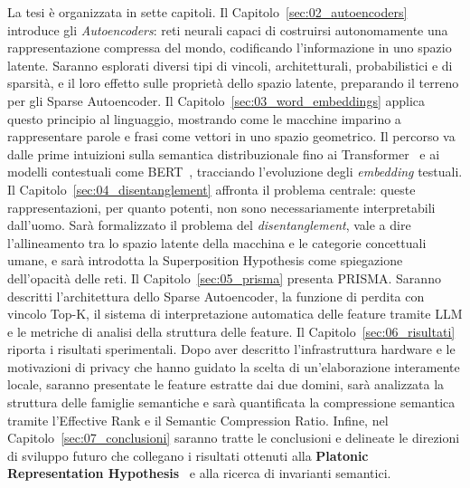 La tesi è organizzata in sette capitoli.
Il Capitolo~\ref{sec:02_autoencoders} introduce gli \textit{Autoencoders}: reti neurali capaci di costruirsi autonomamente una rappresentazione compressa del mondo, codificando l'informazione in uno spazio latente. Saranno esplorati diversi tipi di vincoli, architetturali, probabilistici e di sparsità, e il loro effetto sulle proprietà dello spazio latente, preparando il terreno per gli Sparse Autoencoder.
Il Capitolo~\ref{sec:03_word_embeddings} applica questo principio al linguaggio, mostrando come le macchine imparino a rappresentare parole e frasi come vettori in uno spazio geometrico. Il percorso va dalle prime intuizioni sulla semantica distribuzionale fino ai Transformer~\parencite{vaswani2017attention} e ai modelli contestuali come BERT~\parencite{devlin2018bert}, tracciando l'evoluzione degli \textit{embedding} testuali.
Il Capitolo~\ref{sec:04_disentanglement} affronta il problema centrale: queste rappresentazioni, per quanto potenti, non sono necessariamente interpretabili dall'uomo. Sarà formalizzato il problema del \textit{disentanglement}, vale a dire l'allineamento tra lo spazio latente della macchina e le categorie concettuali umane, e sarà introdotta la Superposition Hypothesis come spiegazione dell'opacità delle reti.
Il Capitolo~\ref{sec:05_prisma} presenta PRISMA. Saranno descritti l'architettura dello Sparse Autoencoder, la funzione di perdita con vincolo Top-K, il sistema di interpretazione automatica delle feature tramite LLM e le metriche di analisi della struttura delle feature.
Il Capitolo~\ref{sec:06_risultati} riporta i risultati sperimentali. Dopo aver descritto l'infrastruttura hardware e le motivazioni di privacy che hanno guidato la scelta di un'elaborazione interamente locale, saranno presentate le feature estratte dai due domini, sarà analizzata la struttura delle famiglie semantiche e sarà quantificata la compressione semantica tramite l'Effective Rank e il Semantic Compression Ratio. 
Infine, nel Capitolo~\ref{sec:07_conclusioni} saranno tratte le conclusioni e delineate le direzioni di sviluppo futuro che collegano i risultati ottenuti alla \textbf{Platonic Representation Hypothesis}~\parencite{huh2024platonic} e alla ricerca di invarianti semantici.
